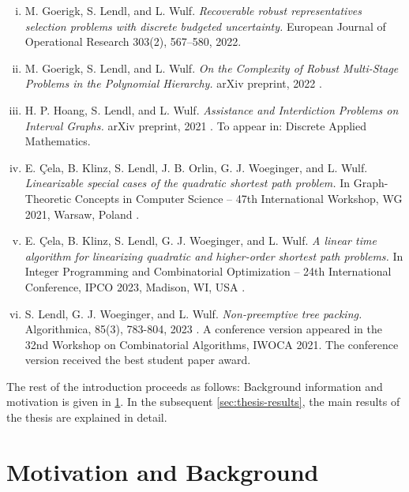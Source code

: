 \begin{enumerate}[(i)]
\item M. Goerigk, S. Lendl, and L. Wulf. \textit{Recoverable robust representatives selection problems with discrete budgeted uncertainty.} European Journal of Operational Research 303(2), 567--580, 2022. \cite{goerigk2022recoverable}

\item M. Goerigk, S. Lendl, and L. Wulf. \textit{On the Complexity of Robust Multi-Stage Problems in the Polynomial Hierarchy.} arXiv preprint, 2022 \cite{goerigk2022complexity}.

\item H. P. Hoang, S. Lendl, and L. Wulf.  \textit{Assistance and Interdiction Problems on Interval Graphs.} arXiv preprint, 2021 \cite{hoang2021assistance}. To appear in: Discrete Applied Mathematics.

\item E. Çela, B. Klinz, S. Lendl, J. B. Orlin, G. J. Woeginger, and L. Wulf. \textit{Linearizable
special cases of the quadratic shortest path problem.} In Graph-Theoretic Concepts in Computer Science -- 47th
International Workshop, WG 2021, Warsaw, Poland \cite{cela2021linearizable}.

\item E. Çela, B. Klinz, S. Lendl, G. J. Woeginger, and L. Wulf. \textit{A linear time algorithm
for linearizing quadratic and higher-order shortest path problems.} In Integer Programming and Combinatorial Optimization -- 24th
International Conference, IPCO 2023, Madison, WI, USA \cite{cela2023linear}.

\item S. Lendl, G. J. Woeginger, and L. Wulf. \textit{Non-preemptive tree packing.} Algorithmica, 85(3), 783-804, 2023 \cite{lendl2023nonpreemptive}. A conference version appeared in the 32nd Workshop on Combinatorial Algorithms, IWOCA 2021. The conference version received the best student paper award.
 \end{enumerate}

The rest of the introduction proceeds as follows: Background information and motivation is given in \cref{sec:motivation-background}. In the subsequent  \cref{sec:thesis-results}, the main results of the thesis are explained in detail.

\section{Motivation and Background}
\label{sec:motivation-background}

